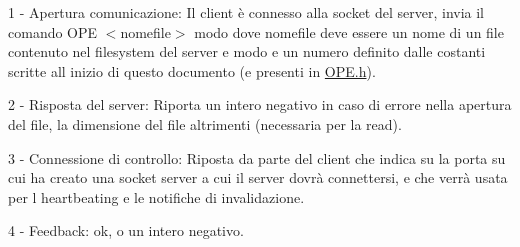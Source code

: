 1 -\/ Apertura comunicazione\+: Il client è connesso alla socket del server, invia il comando {\ttfamily O\+PE $<$nomefile$>$ modo} dove nomefile deve essere un nome di un file contenuto nel filesystem del server e modo e\textquotesingle{} un numero definito dalle costanti scritte all\textquotesingle{} inizio di questo documento (e presenti in \hyperlink{OPE_8h}{O\+P\+E.\+h}).
\begin{DoxyItemize}
\item 2 -\/ Risposta del server\+: Riporta un intero negativo in caso di errore nella apertura del file, la dimensione del file altrimenti (necessaria per la read).
\item 3 -\/ Connessione di controllo\+: Riposta da parte del client che indica su la porta su cui ha creato una socket server a cui il server dovrà connettersi, e che verrà usata per l\textquotesingle{} heartbeating e le notifiche di invalidazione.
\item 4 -\/ Feedback\+: ok, o un intero negativo. 
\end{DoxyItemize}